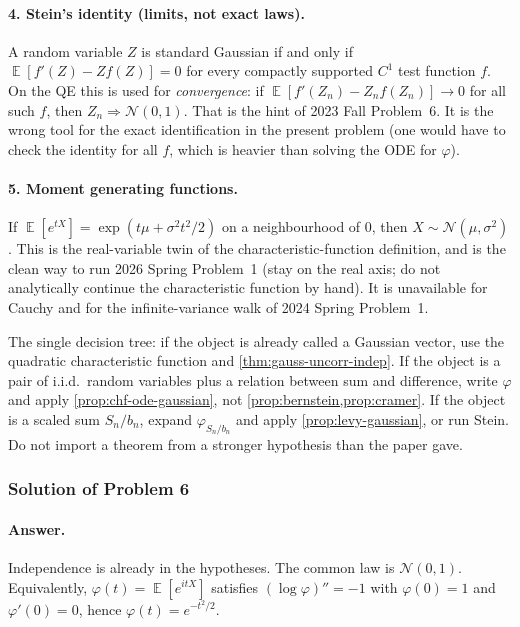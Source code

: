 \documentclass[11pt,a4paper]{article}
\DeclareMathOperator{\E}{\mathbb{E}}
\begin{document}
\paragraph{4. Stein's identity (limits, not exact laws).}
A random variable \( Z \) is standard Gaussian if and only if \( \E[f'(Z)-Zf(Z)]=0 \) for every compactly supported \( C^{1} \) test function \( f \). On the QE this is used for \emph{convergence}: if \( \E[f'(Z_n)-Z_nf(Z_n)]\to 0 \) for all such \( f \), then \( Z_n\Rightarrow\mathcal{N}(0,1) \). That is the hint of 2023 Fall Problem~6. It is the wrong tool for the exact identification in the present problem (one would have to check the identity for all \( f \), which is heavier than solving the ODE for \( \varphi \)).

\paragraph{5. Moment generating functions.}
If \( \E[e^{tX}]=\exp(t\mu+\sigma^{2}t^{2}/2) \) on a neighbourhood of \( 0 \), then \( X\sim\mathcal{N}(\mu,\sigma^{2}) \). This is the real-variable twin of the characteristic-function definition, and is the clean way to run 2026 Spring Problem~1 (stay on the real axis; do not analytically continue the characteristic function by hand). It is unavailable for Cauchy and for the infinite-variance walk of 2024 Spring Problem~1.

The single decision tree: if the object is already called a Gaussian vector, use the quadratic characteristic function and \cref{thm:gauss-uncorr-indep}. If the object is a pair of i.i.d.\ random variables plus a relation between sum and difference, write \( \varphi \) and apply \cref{prop:chf-ode-gaussian}, not \cref{prop:bernstein,prop:cramer}. If the object is a scaled sum \( S_n/b_n \), expand \( \varphi_{S_n/b_n} \) and apply \cref{prop:levy-gaussian}, or run Stein. Do not import a theorem from a stronger hypothesis than the paper gave.

\subsubsection{Solution of Problem 6}

\paragraph{Answer.}
Independence is already in the hypotheses. The common law is \( \mathcal{N}(0,1) \). Equivalently, \( \varphi(t)=\E[e^{itX}] \) satisfies \( (\log\varphi)''=-1 \) with \( \varphi(0)=1 \) and \( \varphi'(0)=0 \), hence \( \varphi(t)=e^{-t^{2}/2} \).
\end{document}
